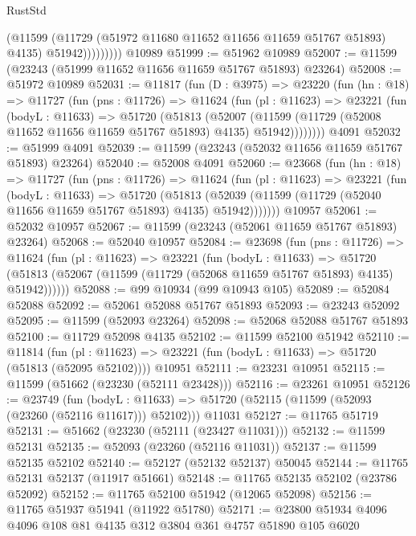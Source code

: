 \begin{lexlean}{RustStd}
\begin{coremodule}
                    (@11599
                      (@11729 (@51972 @11680 @11652 @11656 @11659 @51767 @51893) @4135)
                      @51942)))))))))
    @10989
@51999 := @51962 @10989
@52007 := @11599 (@23243 (@51999 @11652 @11656 @11659 @51767 @51893) @23264)
@52008 := @51972 @10989
@52031 := @11817
    (fun (D : @3975) =>
    @23220
      (fun (hn : @18) =>
      @11727
        (fun (pns : @11726) =>
        @11624
          (fun (pl : @11623) =>
          @23221
            (fun (bodyL : @11633) =>
            @51720
              (@51813
                (@52007
                  (@11599 (@11729 (@52008 @11652 @11656 @11659 @51767 @51893) @4135) @51942))))))))
    @4091
@52032 := @51999 @4091
@52039 := @11599 (@23243 (@52032 @11656 @11659 @51767 @51893) @23264)
@52040 := @52008 @4091
@52060 := @23668
    (fun (hn : @18) =>
    @11727
      (fun (pns : @11726) =>
      @11624
        (fun (pl : @11623) =>
        @23221
          (fun (bodyL : @11633) =>
          @51720
            (@51813
              (@52039 (@11599 (@11729 (@52040 @11656 @11659 @51767 @51893) @4135) @51942)))))))
    @10957
@52061 := @52032 @10957
@52067 := @11599 (@23243 (@52061 @11659 @51767 @51893) @23264)
@52068 := @52040 @10957
@52084 := @23698
    (fun (pns : @11726) =>
    @11624
      (fun (pl : @11623) =>
      @23221
        (fun (bodyL : @11633) =>
        @51720 (@51813 (@52067 (@11599 (@11729 (@52068 @11659 @51767 @51893) @4135) @51942))))))
@52088 := @99 @10934 (@99 @10943 @105)
@52089 := @52084 @52088
@52092 := @52061 @52088 @51767 @51893
@52093 := @23243 @52092
@52095 := @11599 (@52093 @23264)
@52098 := @52068 @52088 @51767 @51893
@52100 := @11729 @52098 @4135
@52102 := @11599 @52100 @51942
@52110 := @11814
    (fun (pl : @11623) => @23221 (fun (bodyL : @11633) => @51720 (@51813 (@52095 @52102))))
    @10951
@52111 := @23231 @10951
@52115 := @11599 (@51662 (@23230 (@52111 @23428)))
@52116 := @23261 @10951
@52126 := @23749
    (fun (bodyL : @11633) => @51720 (@52115 (@11599 (@52093 (@23260 (@52116 @11617))) @52102)))
    @11031
@52127 := @11765 @51719
@52131 := @51662 (@23230 (@52111 (@23427 @11031)))
@52132 := @11599 @52131
@52135 := @52093 (@23260 (@52116 @11031))
@52137 := @11599 @52135 @52102
@52140 := @52127 (@52132 @52137) @50045
@52144 := @11765 @52131 @52137 (@11917 @51661)
@52148 := @11765 @52135 @52102 (@23786 @52092)
@52152 := @11765 @52100 @51942 (@12065 @52098)
@52156 := @11765 @51937 @51941 (@11922 @51780)
@52171 := @23800
    @51934
    @4096
    @4096
    @108
    @81
    @4135
    @312
    @3804
    @361
    @4757
    @51890
    @105
    @6020

\end{coremodule}
\end{lexlean}
